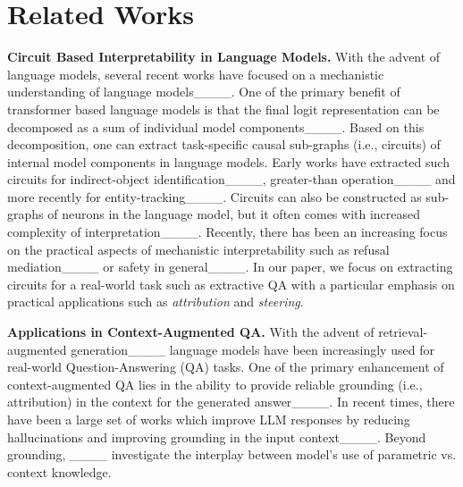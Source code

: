 \section{Related Works}
\textbf{Circuit Based Interpretability in Language Models.} With the advent of language models, several recent works have focused on a mechanistic understanding of language models____. One of the primary benefit of transformer based language models is that the final logit representation can be decomposed as a sum of individual model components____. Based on this decomposition, one can extract task-specific causal sub-graphs (i.e., circuits) of internal model components in language models. Early works have extracted such circuits for indirect-object identification____, greater-than operation____ and more recently for entity-tracking____. %
Circuits can also be constructed as sub-graphs of neurons in the language model, but it often comes with increased complexity of interpretation____. Recently, there has been an increasing focus on the practical aspects of mechanistic interpretability such as refusal mediation____ or safety in general____. In our paper, we focus on extracting circuits for a real-world task such as extractive QA with a particular emphasis on practical applications such as {\it attribution} and {\it steering}.

\textbf{Applications in Context-Augmented QA.} With the advent of retrieval-augmented generation____ language models have been increasingly used for real-world Question-Answering (QA) tasks. One of the primary enhancement of context-augmented QA lies in the ability to provide reliable grounding (i.e., attribution) in the context for the generated answer____. In recent times, there have been a large set of works which improve LLM responses by reducing hallucinations and improving grounding in the input context____.
Beyond grounding, ____ investigate the interplay between model's use of parametric vs. context knowledge.
\vspace{-0.4cm}